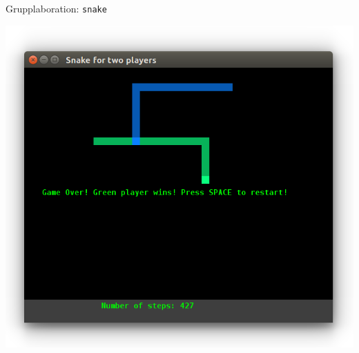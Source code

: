 

\ifkompendium\else





\begin{Slide}{Grupplaboration: \texttt{snake}}
\begin{minipage}{0.6\textwidth}
\includegraphics[width=1.0\textwidth]{../img/snake-twoplayer}
\end{minipage}%
\begin{minipage}{0.4\textwidth}
\begin{itemize}

\end{itemize}
\end{minipage}%
\end{Slide}

